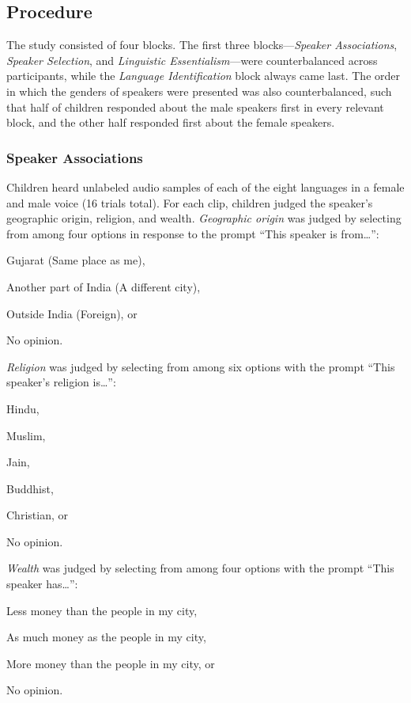 \documentclass{foushee-adapted-preprint}
\begin{document}
\subsection*{Procedure}
The study consisted of four blocks. The first three blocks---\textit{Speaker Associations}, \textit{Speaker Selection}, and \textit{Linguistic Essentialism}---were counterbalanced across participants, while the \textit{Language Identification} block always came last. The order in which the genders of speakers were presented was also counterbalanced, such that half of children responded about the male speakers first in every relevant block, and the other half responded first about the female speakers. 

\subsubsection*{Speaker Associations}
Children heard unlabeled audio samples of each of the eight languages in a female and male voice (16 trials total). For each clip, children judged the speaker's geographic origin, religion, and wealth. 
\textit{Geographic origin} was judged by selecting from among four options in response to the prompt ``This speaker is from\ldots'': 
\begin{inparaenum}[(a)]
    \item Gujarat (Same place as me),
    \item Another part of India (A different city),
    \item Outside India (Foreign), or
    \item No opinion. 
\end{inparaenum}
\textit{Religion} was judged by selecting from among six options with the prompt ``This speaker's religion is\ldots'': 
\begin{inparaenum}[(a)]
    \item Hindu,
    \item Muslim,
    \item Jain,
    \item Buddhist,
    \item Christian, or
    \item No opinion. 
\end{inparaenum}
\textit{Wealth} was judged by selecting from among four options with the prompt ``This speaker has\ldots'': 
\begin{inparaenum}[(a)]
    \item Less money than the people in my city,
    \item As much money as the people in my city,
    \item More money than the people in my city, or 
    \item No opinion. 
\end{inparaenum}
\end{document}
